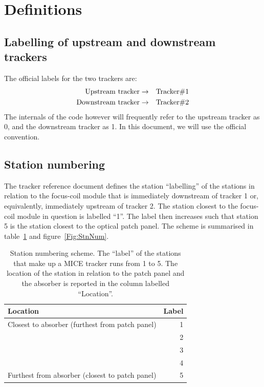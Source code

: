 \section{Definitions}
\label{Sect:Definitions}

\subsection{Labelling of upstream and downstream trackers}
\label{SubSect:TkrLabel}

The official labels for the two trackers are: 
\begin{eqnarray}
  {\rm Upstream~tracker}   & \rightarrow & {\rm Tracker \# 1} \nonumber \\
  {\rm Downstream~tracker} & \rightarrow & {\rm Tracker \# 2} \nonumber 
\end{eqnarray}
The internals of the code however will frequently refer to the upstream tracker as 0, and the downstream tracker as 1. In this document, we will use the official convention.

\subsection{Station numbering}
\label{SubSect:StnNumbering}

The tracker reference document defines the station ``labelling'' of the stations in relation to the focus-coil module that is immediately downstream of tracker 1 or, equivalently, immediately upstream of tracker 2.  The station closest to the focus-coil module in question is labelled  ``1''.  The label then increases such that station 5 is the station
closest to the optical patch panel. The scheme is summarised in table~\ref{Tab:StnNum} and figure~\ref{Fig:StnNum}.

\begin{table}[hb]
  \caption{Station numbering scheme. The ``label'' of the stations that make up a MICE tracker runs from 1 to 5. The location of the station in relation to the patch panel and the absorber is reported in the column labelled ``Location''.}
  \label{Tab:StnNum}
  \begin{tabular}{|l|r|}
    \hline
    {\bf Location}                                  & {\bf Label} \\
    \hline
    Closest to absorber (furthest from patch panel) &           1 \\
                                                    &           2 \\ 
                                                    &           3 \\
                                                    &           4 \\
    Furthest from absorber (closest to patch panel) &           5 \\
    \hline
  \end{tabular}
\end{table}

